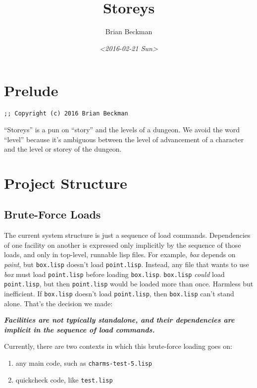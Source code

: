 \documentclass[10pt,oneside,x11names]{article}
\author{Brian Beckman}
\date{\textit{<2016-02-21 Sun>}}
\title{Storeys}
\begin{document}
\maketitle
\setcounter{tocdepth}{2}
\tableofcontents


\section{Prelude}
\label{sec:orgheadline1}

\begin{verbatim}
;; Copyright (c) 2016 Brian Beckman
\end{verbatim}

``Storeys'' is a pun on ``story'' and the levels of a dungeon. We avoid the word
``level'' because it's ambiguous between the level of advancement of a character
and the level or storey of the dungeon.

\section{Project Structure}
\label{sec:orgheadline4}

\subsection{Brute-Force Loads}
\label{sec:orgheadline2}

The current system structure is just a sequence of load commands. Dependencies
of one facility on another is expressed only implicitly by the sequence of those
loads, and only in top-level, runnable lisp files. For example, \emph{box} depends on
\emph{point}, but \texttt{box.lisp} doesn't load \texttt{point.lisp}. Instead, any file that wants
to use \emph{box} must load \texttt{point.lisp} before loading \texttt{box.lisp}. \texttt{box.lisp}
\emph{could} load \texttt{point.lisp}, but then \texttt{point.lisp} would be loaded more than once.
Harmless but inefficient. If \texttt{box.lisp} doesn't load \texttt{point.lisp}, then
\texttt{box.lisp} can't stand alone. That's the decision we made:

\textbf{\emph{Facilities are not typically standalone, and their dependencies are implicit in the sequence of load commands.}}

Currently, there are two contexts in which this brute-force loading goes on:
\begin{enumerate}
\item any main code, such as \texttt{charms-test-5.lisp}
\item quickcheck code, like \texttt{test.lisp}
\end{enumerate}
\end{document}
